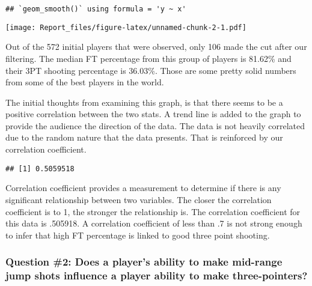\documentclass[
]{article}
\newenvironment{Shaded}{\begin{snugshade}}{\end{snugshade}}
\newcommand{\FunctionTok}[1]{\textcolor[rgb]{0.13,0.29,0.53}{\textbf{#1}}}
\newcommand{\NormalTok}[1]{#1}
\newcommand{\SpecialCharTok}[1]{\textcolor[rgb]{0.81,0.36,0.00}{\textbf{#1}}}
\begin{document}
\begin{verbatim}
## `geom_smooth()` using formula = 'y ~ x'
\end{verbatim}

\texttt{[image: Report\_files/figure-latex/unnamed-chunk-2-1.pdf]}

Out of the 572 initial players that were observed, only 106 made the cut
after our filtering. The median FT percentage from this group of players
is 81.62\% and their 3PT shooting percentage is 36.03\%. Those are some
pretty solid numbers from some of the best players in the world.

The initial thoughts from examining this graph, is that there seems to
be a positive correlation between the two stats. A trend line is added
to the graph to provide the audience the direction of the data. The data
is not heavily correlated due to the random nature that the data
presents. That is reinforced by our correlation coefficient.

\begin{Shaded}
\end{Shaded}

\begin{verbatim}
## [1] 0.5059518
\end{verbatim}

Correlation coefficient provides a measurement to determine if there is
any significant relationship between two variables. The closer the
correlation coefficient is to 1, the stronger the relationship is. The
correlation coefficient for this data is .505918. A correlation
coefficient of less than .7 is not strong enough to infer that high FT
percentage is linked to good three point shooting.

\subsubsection{\texorpdfstring{\textbf{Question \#2: Does a player's
ability to make mid-range jump shots influence a player ability to make
three-pointers?}}{Question \#2: Does a player's ability to make mid-range jump shots influence a player ability to make three-pointers?}}\label{question-2-does-a-players-ability-to-make-mid-range-jump-shots-influence-a-player-ability-to-make-three-pointers}
\end{document}
